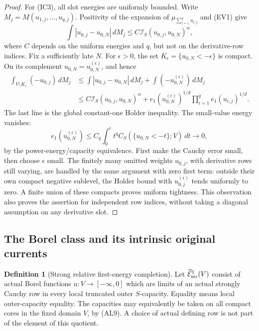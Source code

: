 \documentclass[11pt,a4paper]{article}
\numberwithin{equation}{section}
\theoremstyle{definition}
\newtheorem{definition}[theorem]{Definition}
\theoremstyle{remark}
\begin{document}
\begin{proof}
For (IC3), all slot energies are uniformly bounded. Write
$M_j=M(u_{1,j},\ldots,u_{q,j})$. Positivity of the expansion
of $\mu_{\sum_{i=1}^q u_{i,j}}$ and (EV1) give
\[
             \int|u_{0,j}-u_{0,N}|\,dM_j
                  \leq C\mathscr I_S(u_{0,j},u_{0,N})^\alpha,
 \tag{IC6}
\]
where $C$ depends on the uniform energies and $q$, but not on
the derivative-row indices. Fix a sufficiently late $N$.
For $\epsilon>0$, the set
$K_\epsilon=\overline{\{u_{0,N}<-\epsilon\}}$ is compact.
On its complement $u_{0,N}=u_{0,N}^{(\epsilon)}$, and hence
\[
 \begin{split}
 \int_{V\setminus K_\epsilon}(-u_{0,j})\,dM_j
 &\leq \int|u_{0,j}-u_{0,N}|\,dM_j
          +\int(-u_{0,N}^{(\epsilon)})\,dM_j\\
 &\leq C\mathscr I_S(u_{0,j},u_{0,N})^\alpha
       +e_1(u_{0,N}^{(\epsilon)})^{1/d}
                          \prod_{i=1}^q e_1(u_{i,j})^{1/d}.
 \end{split}
 \tag{IC7}
\]
The last line is the global constant-one Holder inequality.
The small-value energy vanishes:
\[
 e_1(u_{0,N}^{(\epsilon)})
   \leq C_q\int_0^\epsilon t^q
                    C_S(\{u_{0,N}<-t\};V)\,dt\longrightarrow0,
 \tag{IC8}
\]
by the power-energy/capacity equivalence. First make the
Cauchy error small, then choose $\epsilon$ small. The
finitely many omitted weights $u_{0,j}$, with derivative
rows still varying, are handled by the same argument with
zero first term: outside their own compact negative sublevel,
the Holder bound with $u_{0,j}^{(\epsilon)}$ tends uniformly
to zero. A finite union of these compacts proves uniform
tightness. This observation also proves the assertion for
independent row indices, without taking a diagonal assumption
on any derivative slot.
\end{proof}

\subsection{The Borel class and its intrinsic original currents}

\begin{definition}[Strong relative first-energy completion]
\label{def:r11-strong-first-energy-completion}
Let $\widehat{\mathcal E}^1_{\rm str}(V)$ consist of actual
Borel functions $u:V\to[-\infty,0]$ which are limits of an
actual strongly Cauchy row in every local truncated outer
$S$-capacity. Equality means local outer-capacity equality.
The capacities may equivalently be taken on all compact
cores in the fixed domain $V$, by (AL9). A choice of actual
defining row is not part of the element of this quotient.
\end{definition}
\end{document}
